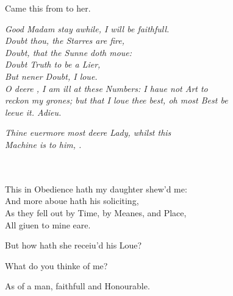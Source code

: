 \documentclass[a5paper,DIV=calc,11pt]{scrbook}
\begin{document}
\begin{drama*}
    \queenspeaks Came this from \ham to her.
    
    \polspeaks \textit{Good Madam stay awhile, I will be faithfull.\\
    Doubt thou, the Starres are fire,\\
    Doubt, that the Sunne doth moue:\\
    Doubt Truth to be a Lier,\\
    But nener Doubt, I loue.\\
    O deere \ophe, I am ill at these Numbers: I haue not Art to\\
    reckon my grones; but that I loue thee best, oh most Best be\\
    leeue it. Adieu.}\\\vspace{6pt}
    \hspace{8em}\parbox{20em}{\textit{Thine euermore most deere Lady, whilst this\\
    Machine is to him, \ham.}}\\
    \mbox{}\\
    This in Obedience hath my daughter shew'd me:\\
    And more aboue hath his soliciting,\\
    As they fell out by Time, by Meanes, and Place,\\
    All giuen to mine eare.
    
    \kingspeaks But how hath she receiu'd his Loue?
    
    \polspeaks What do you thinke of me?
    
    \kingspeaks As of a man, faithfull and Honourable.
    

\end{drama*}
\end{document}
